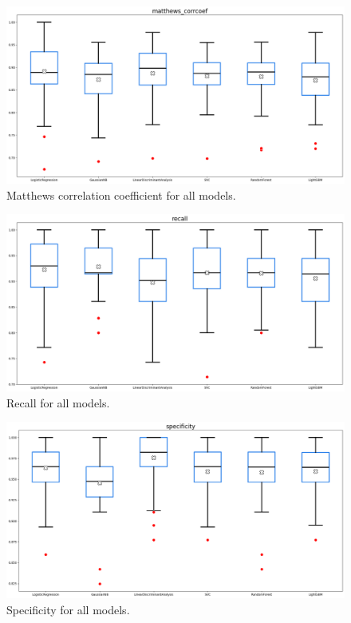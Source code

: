 \documentclass[12pt]{article}
\begin{document}
\begin{figure}[H]
    \centering
    \includegraphics[width=\textwidth]{ims/mcc.png}
    \caption{Matthews correlation coefficient for all models.}
    \label{fig:mcc}
\end{figure}

\begin{figure}[H]
    \centering
    \includegraphics[width=\textwidth]{ims/recall.png}
    \caption{Recall for all models.}
    \label{fig:recall}
\end{figure}

\begin{figure}[H]
    \centering
    \includegraphics[width=\textwidth]{ims/specificity.png}
    \caption{Specificity for all models.}
    \label{fig:specificity}
\end{figure}
\end{document}
